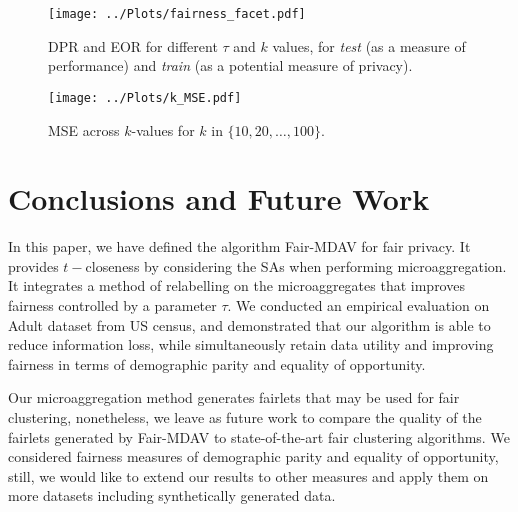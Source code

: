 \documentclass[runningheads]{llncs}
\begin{document}
\begin{figure}[p]
  \centering
  \texttt{[image: ../Plots/fairness\_facet.pdf]}
  \caption{DPR and EOR for different $\tau$ and $k$ values, for \emph{test} (as a measure of performance) and \emph{train} (as a potential measure of privacy).}
  \label{fig:fairness}
\end{figure}

\begin{figure}[p]
  \centering
  \texttt{[image: ../Plots/k\_MSE.pdf]}
  \caption{MSE across $k$-values for $k$ in $\{10, 20, \dots, 100\}$.}
  \label{fig:MSE}
\end{figure}

\section{Conclusions and Future Work}
\label{sec:conclusions}
In this paper, we have defined the algorithm Fair-MDAV for fair privacy. 
It provides $t-$closeness by considering the SAs when performing microaggregation. It integrates a method of relabelling on the microaggregates that improves fairness controlled by a parameter $\tau$.
We conducted an empirical evaluation on Adult dataset from US census, and demonstrated that our algorithm is able to reduce information loss, while simultaneously retain data utility and improving fairness in terms of demographic parity and equality of opportunity.

Our microaggregation method generates fairlets that may be used for fair clustering, nonetheless, we leave as future work to compare the quality of the fairlets generated by Fair-MDAV to state-of-the-art fair clustering algorithms.
We considered fairness measures of demographic parity and equality of opportunity, still, we would like to extend our results to other measures and apply them on more datasets including synthetically generated data.

\newpage


\end{document}
